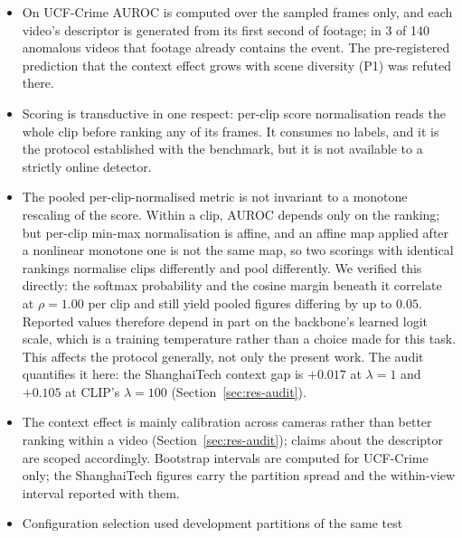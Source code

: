 \documentclass[a4paper,fleqn]{cas-sc}
\begin{document}
\begin{itemize}
        compared on UCF-Crime in Section~\ref{sec:res-ucf}, where it reports
        $80.28$ against $82.4$ here---a difference inside this work's bootstrap
        interval of $[0.756, 0.877]$. Both sample every sixteenth frame, but
        whether LAVAD computes AUROC over the sampled frames is not stated.
  \item On UCF-Crime AUROC is computed over the sampled frames only, and each
        video's descriptor is generated from its first second of
        footage; in 3 of 140 anomalous videos that footage already contains the
        event. The pre-registered prediction that the context effect grows with
        scene diversity (P1) was refuted there.
  \item Scoring is transductive in one respect: per-clip score normalisation
        reads the whole clip before ranking any of its frames. It consumes no
        labels, and it is the protocol established with the benchmark, but it
        is not available to a strictly online detector.
  \item The pooled per-clip-normalised metric is not invariant to a monotone
        rescaling of the score. Within a clip, AUROC depends only on the
        ranking; but per-clip min-max normalisation is affine, and an affine map
        applied after a nonlinear monotone one is not the same map, so two
        scorings with identical rankings normalise clips differently and pool
        differently. We verified this directly: the softmax probability and the
        cosine margin beneath it correlate at $\rho = 1.00$ per clip and still
        yield pooled figures differing by up to $0.05$. Reported values
        therefore depend in part on the backbone's learned logit scale, which is
        a training temperature rather than a choice made for this task. This
        affects the protocol generally, not only the present work. The audit
        quantifies it here: the ShanghaiTech context gap is $+0.017$ at
        $\lambda{=}1$ and $+0.105$ at CLIP's $\lambda{=}100$
        (Section~\ref{sec:res-audit}).
  \item The context effect is mainly calibration across cameras rather than
        better ranking within a video (Section~\ref{sec:res-audit}); claims about
        the descriptor are scoped accordingly. Bootstrap intervals are computed
        for UCF-Crime only; the ShanghaiTech figures carry the partition spread
        and the within-view interval reported with them.
  \item Configuration selection used development partitions of the same test

\end{itemize}
\end{document}
